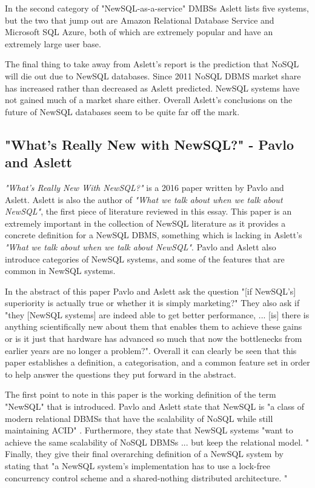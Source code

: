 \documentclass[10pt, conference]{IEEEtran}
\begin{document}
In the second category of "NewSQL-as-a-service" DMBSs Aslett lists five systems, but the two that jump out are Amazon Relational Database Service and Microsoft SQL Azure, both of which are extremely popular and have an extremely large user base. 

The final thing to take away from Aslett's report is the prediction that NoSQL will die out due to NewSQL databases. Since 2011 NoSQL DBMS market share has increased \cite{nosql} rather than decreased as Aslett predicted. NewSQL systems have not gained much of a market share either. Overall Aslett's conclusions on the future of NewSQL databases seem to be quite far off the mark.

\subsection{"What's Really New with NewSQL?" - Pavlo and Aslett}

\textit{"What's Really New With NewSQL?"} \cite{pavlo} is a 2016 paper written by Pavlo and Aslett. Aslett is also the author of \textit{"What we talk about when we talk about NewSQL"}, the first piece of literature reviewed in this essay. This paper is an extremely important in the collection of NewSQL literature as it provides a concrete definition for a NewSQL DBMS, something which is lacking in Aslett's \textit{"What we talk about when we talk about NewSQL"}. Pavlo and Aslett also introduce categories of NewSQL systems, and some of the features that are common in NewSQL systems.

In the abstract of this paper Pavlo and Aslett ask the question "[if NewSQL's] superiority is actually true or whether it is simply marketing?" They also ask if "they [NewSQL systems] are indeed able to get better performance, ... [is] there is anything scientifically new about them that enables them to achieve these gains or is it just that hardware has advanced so much that now the bottlenecks from earlier years are no longer a problem?". Overall it can clearly be seen that this paper establishes a definition, a categorisation, and a common feature set in order to help answer the questions they put forward in the abstract.

The first point to note in this paper is the working definition of the term "NewSQL" that is introduced. Pavlo and Aslett state that NewSQL is "a class of modern relational DBMSs that have the scalability of NoSQL while still maintaining ACID" \cite{pavlo}. Furthermore, they state that NewSQL systems "want to achieve the same scalability of NoSQL DBMSs ... but keep the relational model. \cite{pavlo}" Finally, they give their final overarching definition of a NewSQL system by stating that "a NewSQL system's implementation has to use a lock-free concurrency control scheme and a shared-nothing distributed architecture.  \cite{pavlo}" 
\end{document}
